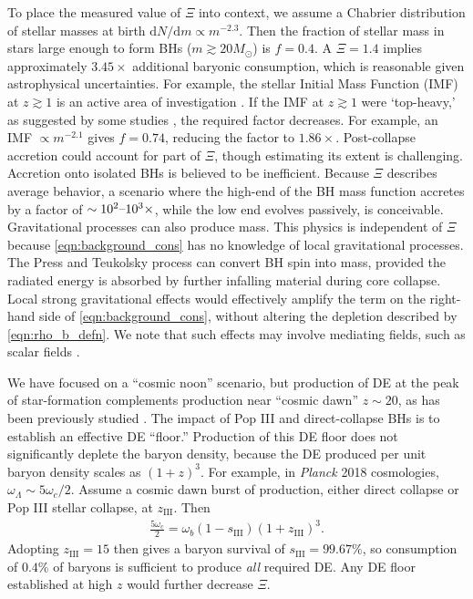 \documentclass[a4paper,11pt]{article}
\renewcommand{\d}[0]{\mathrm{d}}
\begin{document}
To place the measured value of $\Xi$ into context, we assume a Chabrier \cite{ChabrierIMF2003} distribution of stellar masses at birth $\d N/\d m \propto m^{-2.3}$.
Then the fraction of stellar mass in stars large enough to form BHs ($m \gtrsim 20M_\odot$) is $f = 0.4$.
A $\Xi = 1.4$ implies approximately $3.45\times$ additional baryonic consumption, which is reasonable given astrophysical uncertainties.
For example, the stellar Initial Mass Function (IMF) at $z \gtrsim 1$ is an active area of investigation \citep[e.g.][]{SneppenSteinhardt2022, SteinhardtSneppen2022}. 
If the IMF at $z\gtrsim1$ were `top-heavy,' as suggested by some studies \citep{baugh05,lacey16,iani23,yung24}, the required factor decreases.
For example, an IMF $\propto m^{-2.1}$ \citep[e.g.][]{2023Natur.613..460L} gives $f = 0.74$, reducing the factor to $1.86\times$.
Post-collapse accretion could account for part of $\Xi$, though estimating its extent is challenging. 
Accretion onto isolated BHs is believed to be inefficient.
Because $\Xi$ describes average behavior, a scenario where the high-end of the BH mass function accretes by a factor of $\sim 10^2\text{\textendash} 10^3\times$, while the low end evolves passively, is conceivable.
Gravitational processes can also produce mass.
This physics is independent of $\Xi$ because \cref{eqn:background_cons} has no knowledge of local gravitational processes.
The Press and Teukolsky process \cite{Misner1972, PressTeukolsky1972} can convert BH spin into mass, provided the radiated energy is absorbed by further infalling material during core collapse.
Local strong gravitational effects would effectively amplify the term on the right-hand side of \cref{eqn:background_cons}, without altering the depletion described by \cref{eqn:rho_b_defn}.
We note that such effects may involve mediating fields, such as scalar fields \cite{SilvaSakstein2018, Herdeiro2021}.

We have focused on a ``cosmic noon'' scenario, but production of DE at the peak of star-formation complements production near ``cosmic dawn'' $z \sim 20$, as has been previously studied \cite{2018PhDT.......194C, CrokerWeiner19, CrokerRunburg20, Farrah23b}.
The impact of Pop III \cite[e.g.][]{MaiolinoPopIIIEvidence2024} and direct-collapse BHs \cite[e.g.][]{Nabizadeh2024} is to establish an effective DE ``floor.''
Production of this DE floor does not significantly deplete the baryon density, because the DE produced per unit baryon density scales as $(1+z)^3$.
For example, in \emph{Planck} 2018 cosmologies, $\omega_\Lambda \sim 5\omega_c/2$.
Assume a cosmic dawn burst of production, either direct collapse or Pop III stellar collapse, at $z_\mathrm{III}$.
Then
\begin{align}
  \frac{5\omega_c}{2} = \omega_b\left(1-s_\mathrm{III}\right)\left(1+z_\mathrm{III}\right)^3.
\end{align}
Adopting $z_\mathrm{III} = 15$ then gives a baryon survival of $s_\mathrm{III} = 99.67\%$, so consumption of $0.4\%$ of baryons is sufficient to produce \emph{all} required DE.
Any DE floor established at high $z$ would further decrease $\Xi$.
\end{document}
